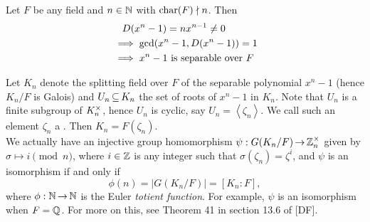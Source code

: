 \documentclass[11pt]{book}
\theoremstyle{definition}   \newtheorem{defn}[counter]{Definition} %
\newcommand{\gen}[1]{\left\langle #1 \right\rangle}   \newcommand{\stab}[2]{\tn{Stab}_{#1}(#2)}   \newcommand{\fix}[2]{\tn{Fix}_{#1}(#2)}   \newcommand{\op}{^{\tn{op}}}
\DeclareMathOperator{\ra}{\rightarrow}   \DeclareMathOperator{\Poly}{\mathbf{P}}   \DeclareMathOperator{\spn}{\textnormal{span}}   \DeclareMathOperator{\aut}{\textnormal{Aut}}
\numberwithin{counter}{chapter}
\begin{document}
\begin{example}
Let $F$ be any field and $n \in \operatorname{\mathbb{N}}$ with $\textnormal{char}(F) \nmid n$. Then
\begin{align*}
& \quad D(x^n-1) = nx^{n-1} \ne 0 \\
&\implies \gcd(x^n-1,D(x^n-1)) = 1 \\
&\implies x^n - 1  \textnormal{ is separable over } F
\end{align*}

Let $K_n$ denote the splitting field over $F$ of the separable polynomial $x^n-1$ (hence $K_n/F$ is Galois) and $U_n \operatorname{\subseteq} K_n$ the set of roots of $x^n-1$ in $K_n$. Note that $U_n$ is a finite subgroup of $K_n^{\times}$, hence $U_n$ is cyclic, say $U_n = \gen{\zeta_n}$. We call such an element $\zeta_n$ a . Then $K_n = F(\zeta_n)$. \\

We actually have an injective group homomorphism $\psi : G(K_n/F) \ra \z_n\x$ given by $\sigma \mapsto i \pmod{n}$, where $i \in \operatorname{\mathbb{Z}}$ is any integer such that $\sigma(\zeta_n) = \zeta^i$, and $\psi$ is an isomorphism if and only if
	\[\phi(n) = |G(K_n/F)| = [K_n : F], \]
where $\phi : \N \ra \N$ is the Euler \emph{totient function}. For example, $\psi$ is an isomorphism when $F = \operatorname{\mathbb{Q}}$. For more on this, see Theorem 41 in section 13.6 of [DF]. 
\end{example}
\end{document}
